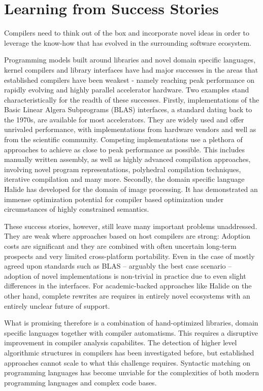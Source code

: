     \section{Learning from Success Stories}

    Compilers need to think out of the box and incorporate novel ideas
    in order to leverage the know-how that has evolved in the surrounding
    software ecosystem.

    Programming models built around libraries and novel domain specific
    languages, kernel compilers and library interfaces have had major successes
    in the areas that established compilers have been weakest - namely reaching
    peak performance on rapidly evolving and highly parallel accelerator
    hardware.
    Two examples stand characteristically for the readth of these successes.
    Firstly, implementations of the Basic Linear Algera Subprograms (BLAS)
    interfaces, a standard dating back to the 1970s, are available for most
    accelerators.
    They are widely used and offer unrivaled performance, with implementations
    from hardware vendors and well as from the scientific community.
    Competing implementations use a plethora of approaches to achieve as close
    to peak performance as possible.
    This includes manually written assembly, as well as highly advanced
    compilation approaches, involving novel program representations, polyhedral
    compilation techniques, iterative compilation and many more.
    Secondly, the domain specific language Halide has developed for the domain
    of image processing.
    It has demonstrated an immense optimization potential for compiler based
    optimization under circumstances of highly constrained semantics.

    These success stories, however, still leave many important problems
    unaddressed.
    They are weak where approaches based on host compilers are strong:
    Adoption costs are significant and they are combined with often uncertain
    long-term prospects and very limited cross-platform portability.
    Even in the case of mostly agreed upon standards such as BLAS --
    arguably the best case scenario -- adoption of novel implementations is
    non-trivial in practice due to even slight differences in the interfaces.
    For academic-backed approaches like Halide on the other hand, complete
    rewrites are requires in entirely novel ecosystems with an entirely unclear
    future of support.

    What is promising therefore is a combination of hand-optimized libraries,
    domain specific languages together with compiler automatisms.
    This requires a disruptive improvement in compiler analysis capabilites.
    The detection of higher level algorithmic structures in compilers has been
    investigated before, but established approaches cannot scale to what
    this challenge requires.
    Syntactic matching on programming languages has become
    unviable for the complexities of both modern programming languages and
    complex code bases.

